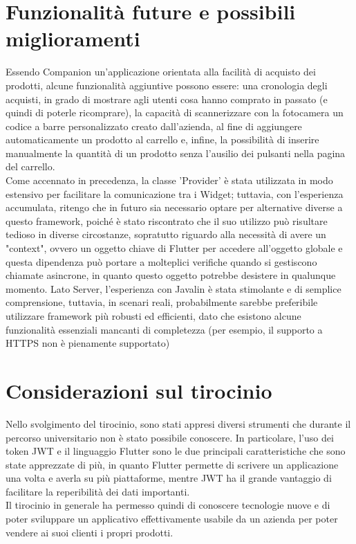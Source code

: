 \section{Funzionalità future e possibili miglioramenti}
Essendo Companion un'applicazione orientata alla facilità di acquisto dei prodotti, alcune funzionalità aggiuntive possono essere: una cronologia degli acquisti, in grado di mostrare agli utenti cosa hanno comprato in passato (e quindi di poterle ricomprare), la capacità di scannerizzare con la fotocamera un codice a barre personalizzato creato dall'azienda, al fine di aggiungere automaticamente un prodotto al carrello e, infine, la possibilità di inserire manualmente la quantità di un prodotto senza l'ausilio dei pulsanti nella pagina del carrello.\\
Come accennato in precedenza, la classe 'Provider' è stata utilizzata in modo estensivo per facilitare la comunicazione tra i Widget; tuttavia, con l'esperienza accumulata, ritengo che in futuro sia necessario optare per alternative diverse a questo framework, poiché è stato riscontrato che il suo utilizzo può risultare tedioso in diverse circostanze, sopratutto riguardo alla necessità di avere un "context", ovvero un oggetto chiave di Flutter per accedere all'oggetto globale e questa dipendenza può portare a molteplici verifiche quando si gestiscono chiamate asincrone, in quanto questo oggetto potrebbe desistere in qualunque momento.
Lato Server, l'esperienza con Javalin è stata stimolante e di semplice comprensione, tuttavia, in scenari reali, probabilmente sarebbe preferibile utilizzare framework più robusti ed efficienti, dato che esistono alcune funzionalità essenziali mancanti di completezza (per esempio, il supporto a HTTPS non è pienamente supportato)

\section{Considerazioni sul tirocinio}
Nello svolgimento del tirocinio, sono stati appresi diversi strumenti che durante il percorso universitario non è stato possibile conoscere. In particolare, l'uso dei token JWT e il linguaggio Flutter sono le due principali caratteristiche che sono state apprezzate di più, in quanto Flutter permette di scrivere un applicazione una volta e averla su più piattaforme, mentre JWT ha il grande vantaggio di facilitare la reperibilità dei dati importanti.\\ Il tirocinio in generale ha permesso quindi di conoscere tecnologie nuove e di poter sviluppare un applicativo effettivamente usabile da un azienda per poter vendere ai suoi clienti i propri prodotti.